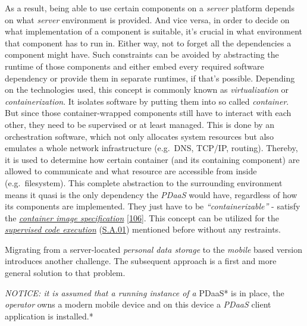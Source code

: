 \documentclass[12pt,english,a4paper,titlepage,cleardoublepage=empty,dottedtoc]{report}
\begin{document}
As a result, being able to use certain components on a \emph{server}
platform depends on what \emph{server} environment is provided. And vice
versa, in order to decide on what implementation of a component is
suitable, it's crucial in what environment that component has to run in.
Either way, not to forget all the dependencies a component might have.
Such constraints can be avoided by abstracting the runtime of those
components and either embed every required software dependency or
provide them in separate runtimes, if that's possible. Depending on the
technologies used, this concept is commonly known as
\emph{virtualization} or \emph{containerization}. It isolates software
by putting them into so called \emph{container}. But since those
container-wrapped components still have to interact with each other,
they need to be supervised or at least managed. This is done by an
orchestration software, which not only allocates system resources but
also emulates a whole network infrastructure (e.g.~DNS, TCP/IP,
routing). Thereby, it is used to determine how certain container (and
its containing component) are allowed to communicate and what resource
are accessible from inside (e.g.~filesystem). This complete abstraction
to the surrounding environment means it quasi is the only dependency the
\emph{PDaaS} would have, regardless of how its components are
implemented. They just have to be \emph{``containerizable''} - satisfy
the \emph{\protect\hyperlink{link-container}{container image
specification}} {[}\protect\hyperlink{ref-web_oci-spec_image}{106}{]}.
This concept can be utilized for the
\emph{\protect\hyperlink{supervised-data-access}{supervised code
execution}} (\protect\hyperlink{sa01}{S.A.01}) mentioned before without
any restraints.

Migrating from a server-located \emph{personal data storage} to the
\emph{mobile} based version introduces another challenge. The subsequent
approach is a first and more general solution to that problem.

\emph{NOTICE: it is assumed that a running instance of a }PDaaS* is in
place, the \emph{operator} owns a modern mobile device and on this
device a \emph{PDaaS} client application is installed.*
\end{document}
